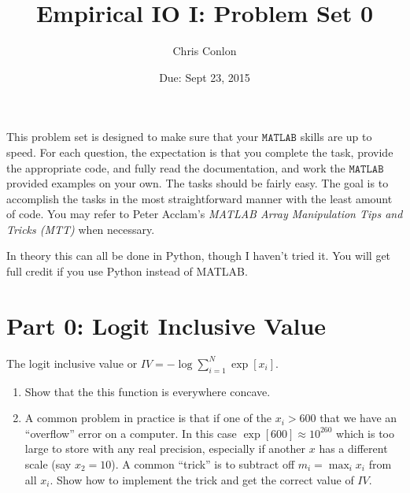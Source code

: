 \documentclass{article}
\begin{document}
\title{Empirical IO I: Problem Set 0}
\author{Chris Conlon}
\date{Due: Sept 23, 2015}
\maketitle
This problem set is designed to make sure that your $\mathtt{MATLAB}$ skills are up to speed. For each question, the expectation is that you complete the task, provide the appropriate code, and fully read the documentation, and work the $\mathtt{MATLAB}$ provided examples on your own.  The tasks should be fairly easy.  The goal is to accomplish the tasks in the most straightforward manner with the least amount of code.  You may refer to Peter Acclam's \emph{MATLAB Array Manipulation Tips and Tricks (MTT)} when necessary.

In theory this can all be done in Python, though I haven't tried it. You will get full credit if you use Python instead of MATLAB.


\section*{Part 0: Logit Inclusive Value}
The logit inclusive value or $IV = -\log \sum_{i=1}^N \exp[x_i]$.
\begin{enumerate}
\item Show that the this function is everywhere concave.
\item A common problem in practice is that if one of the $x_i > 600$ that we have an ``overflow'' error on a computer. In this case $\exp[600] \approx 10^{260}$ which is too large to store with any real precision, especially if another $x$ has a different scale (say $x_2=10$). A common ``trick'' is to subtract off $m_i = \max_i x_i$ from all $x_i$.  Show how to implement the trick and get the correct value of $IV$.
\end{enumerate}
\end{document}
